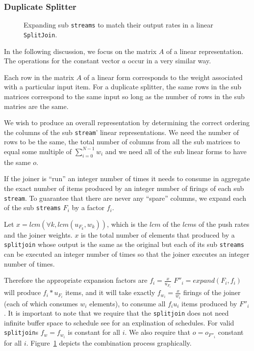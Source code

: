 \subsubsection{Duplicate Splitter}

\begin{figure}
\center
\epsfxsize=3.0in
\caption{Expanding sub {\tt streams} to match their output rates in a linear {\tt SplitJoin}.}
\label{fig:splitjoin-duplicate-ratematch}
\end{figure}

In the following discussion, we focus on the matrix $A$ of a linear representation.
The operations for the constant vector $a$ occur in a very similar way.

Each row in the matrix $A$ of a linear form corresponds to the
weight associated with a particular input item. For a duplicate splitter,
the same rows in the sub matrices correspond to the same
input so long as the number of rows in the sub matries are the same.

We wish to produce an overall representation by determining the correct
ordering the columns of the sub {\tt stream}' linear representations. We
need the number of rows to be the same, the total number of columns 
from all the sub matrices to equal some multiple of $\sum_{i=0}^{N-1}w_i$
and we need all of the sub linear forms to have the same $o$. 

If the joiner is ``run'' an integer number of times it needs to consume in aggregate
the exact number of items produced by an integer number of firings of
each sub {\tt stream}. To guarantee that there are never any ``spare'' columns,
we expand each of the sub {\tt streams} $F_i$ by a factor $f_i$.

Let $x=lcm(\forall k, lcm(u_{F_k},w_k))$, which is the $lcm$ of the $lcm$s of 
the push rates and the joiner weights. $x$ is the total number of elements that 
produced by a {\tt splitjoin} whose output is the same as the original but each 
of its sub {\tt streams} can be executed an integer number of times so that 
the joiner executes an integer number of times.

Therefore the appropriate expansion factors are  $f_i=\frac{x}{u_{F_i}}$ 
$F''_i = expand(F_i,f_i)$ will produce $f_i*u_{F_i}$ items, and it will take 
exactly $f_{w_i}=\frac{x}{w_i}$ firings of the 
joiner (each of which consumes $w_i$ elements), to consume all $f_iu_i$ items produced by $F''_i$.
It is important to note that we require that the {\tt splitjoin} does not need
infinite buffer space to schedule see \cite{karczma-thesis} for an explination of schedules. 
For valid {\tt splitjoin}s $f_w=f_{w_i}$ is constant for all $i$. We also require that $o=o_{F''_i}$
constant for all $i$. Figure~\ref{fig:splitjoin-duplicate-ratematch} depicts the 
combination process graphically.

